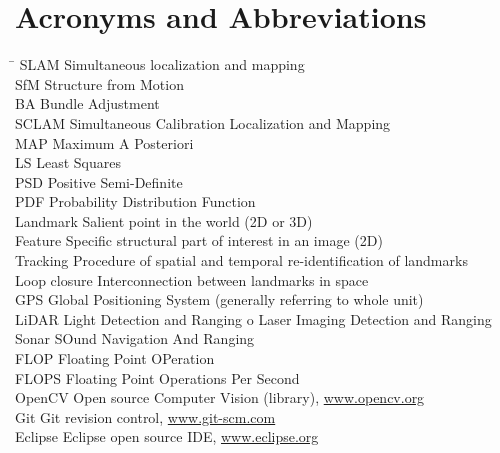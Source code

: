 \section*{Acronyms and Abbreviations}
\label{sec:acronyms}
\begin{tabbing}
	\hspace*{3.5cm}		\= \kill
	SLAM \> Simultaneous localization and mapping \\[1ex]
    SfM \> Structure from Motion \\[1ex]
    BA \> Bundle Adjustment \\[1ex]
    SCLAM \> Simultaneous Calibration Localization and Mapping \\[1ex]
    MAP \> Maximum A Posteriori \\[1ex]
    LS \> Least Squares \\[1ex]
    PSD \> Positive Semi-Definite \\[1ex]
    PDF \> Probability Distribution Function \\[1ex]
    Landmark \> Salient point in the world (2D or 3D) \\[1ex]
	Feature \> Specific structural part of interest in an image (2D) \\[1ex]
	Tracking \> Procedure of spatial and temporal re-identification of landmarks \\[1ex]
	Loop closure \> Interconnection between landmarks in space \\[1ex]
	GPS \> Global Positioning System (generally referring to whole unit) \\[1ex]
    LiDAR \> Light Detection and Ranging o Laser Imaging Detection and Ranging \\[1ex]
    Sonar \> SOund Navigation And Ranging \\[1ex]
    FLOP \> Floating Point OPeration \\[1ex]
    FLOPS \> Floating Point Operations Per Second \\[1ex]
	OpenCV  \> Open source Computer Vision (library), \url{www.opencv.org} \\[1ex]
	Git  \> Git revision control, \url{www.git-scm.com} \\[1ex]
	Eclipse \> Eclipse open source IDE, \url{www.eclipse.org}
\end{tabbing}